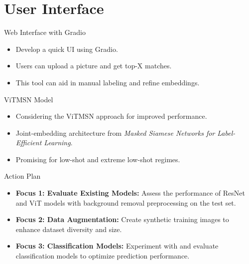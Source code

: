 \documentclass{beamer}
\begin{document}
\section{User Interface}
\begin{frame}{Web Interface with Gradio}
\begin{itemize}
    \item Develop a quick UI using Gradio.
    \item Users can upload a picture and get top-X matches.
    \item This tool can aid in manual labeling and refine embeddings.
\end{itemize}
\end{frame}


\begin{frame}{ViTMSN Model}
\begin{itemize}
    \item Considering the ViTMSN approach for improved performance.
    \item Joint-embedding architecture from \emph{Masked Siamese Networks for Label-Efficient Learning}.
    \item Promising for low-shot and extreme low-shot regimes.
\end{itemize}
\end{frame}

\begin{frame}{Action Plan}
    \begin{itemize}
        \item \textbf{Focus 1: Evaluate Existing Models:} 
              Assess the performance of ResNet and ViT models with background removal preprocessing on the test set.
        \item \textbf{Focus 2: Data Augmentation:} 
              Create synthetic training images to enhance dataset diversity and size.
        \item \textbf{Focus 3: Classification Models:} 
              Experiment with and evaluate classification models to optimize prediction performance.
    \end{itemize}
    \end{frame}
\end{document}
